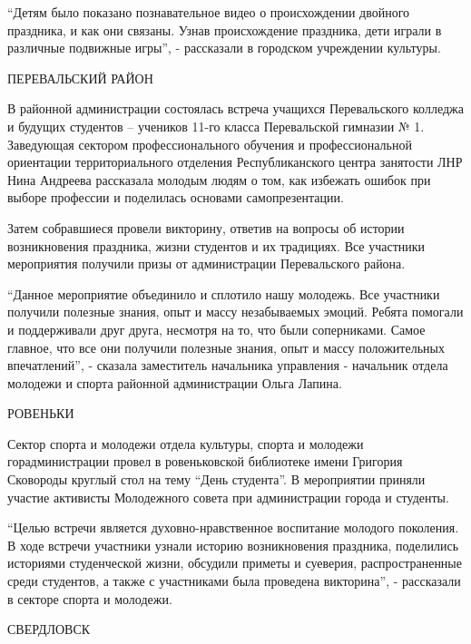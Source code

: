\enquote{Детям было показано познавательное видео о происхождении двойного праздника, и
как они связаны. Узнав происхождение праздника, дети играли в различные
подвижные игры}, - рассказали в городском учреждении культуры.

ПЕРЕВАЛЬСКИЙ РАЙОН

В районной администрации состоялась встреча учащихся Перевальского колледжа и
будущих студентов – учеников 11-го класса Перевальской гимназии № 1. Заведующая
сектором профессионального обучения и профессиональной ориентации
территориального отделения Республиканского центра занятости ЛНР Нина Андреева
рассказала молодым людям о том, как избежать ошибок при выборе профессии и
поделилась основами самопрезентации.   


Затем собравшиеся провели викторину, ответив на вопросы об истории
возникновения праздника, жизни студентов и их традициях. Все участники
мероприятия получили призы от администрации Перевальского района.


\enquote{Данное мероприятие объединило и сплотило нашу молодежь. Все участники получили
полезные знания, опыт и массу незабываемых эмоций. Ребята помогали и
поддерживали друг друга, несмотря на то, что были соперниками. Самое главное,
что все они получили полезные знания, опыт и массу положительных впечатлений},
- сказала заместитель начальника управления - начальник отдела молодежи и
спорта районной администрации Ольга Лапина.

РОВЕНЬКИ

Сектор спорта и молодежи отдела культуры, спорта и молодежи горадминистрации
провел в ровеньковской библиотеке имени Григория Сковороды круглый стол на тему
\enquote{День студента}. В мероприятии приняли участие активисты Молодежного совета при
администрации города и студенты.


\enquote{Целью встречи является духовно-нравственное воспитание молодого поколения. В
ходе встречи участники узнали историю возникновения праздника, поделились
историями студенческой жизни, обсудили приметы и суеверия, распространенные
среди студентов, а также с участниками была проведена викторина}, - рассказали
в секторе спорта и молодежи.

СВЕРДЛОВСК

